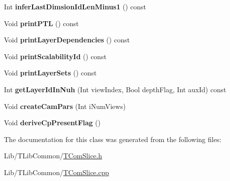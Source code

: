 \begin{DoxyCompactItemize}
\mbox{\label{class_t_com_v_p_s_a3a8ea773623143b32431a4b4889fc67b}} 
Int {\bfseries infer\+Last\+Dimsion\+Id\+Len\+Minus1} () const
\item 
\mbox{\label{class_t_com_v_p_s_ab693d26589a16f90f6168ea858cb7b8c}} 
Void {\bfseries print\+P\+TL} () const
\item 
\mbox{\label{class_t_com_v_p_s_addfb2f2160bd83ee29505eac53fb4176}} 
Void {\bfseries print\+Layer\+Dependencies} () const
\item 
\mbox{\label{class_t_com_v_p_s_aef60f77a62ed01f3b817abac2491c6a0}} 
Void {\bfseries print\+Scalability\+Id} () const
\item 
\mbox{\label{class_t_com_v_p_s_a9cf96875c7f092d8512ce5b0a486c3df}} 
Void {\bfseries print\+Layer\+Sets} () const
\item 
\mbox{\label{class_t_com_v_p_s_aae519e87060ec934d12d77f273408cc6}} 
Int {\bfseries get\+Layer\+Id\+In\+Nuh} (Int view\+Index, Bool depth\+Flag, Int aux\+Id) const
\item 
\mbox{\label{class_t_com_v_p_s_a24360cfb32e60efa398ed0851760de42}} 
Void {\bfseries create\+Cam\+Pars} (Int i\+Num\+Views)
\item 
\mbox{\label{class_t_com_v_p_s_abdecf5da8703111e1419734d0b6de751}} 
Void {\bfseries derive\+Cp\+Present\+Flag} ()
\end{DoxyCompactItemize}


The documentation for this class was generated from the following files\+:\begin{DoxyCompactItemize}
\item 
Lib/\+T\+Lib\+Common/\hyperlink{_t_com_slice_8h}{T\+Com\+Slice.\+h}\item 
Lib/\+T\+Lib\+Common/\hyperlink{_t_com_slice_8cpp}{T\+Com\+Slice.\+cpp}\end{DoxyCompactItemize}
